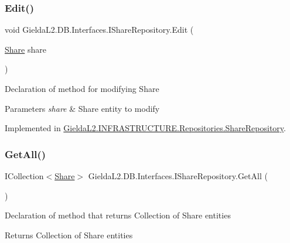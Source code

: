 \subsubsection{\texorpdfstring{Edit()}{Edit()}}
{\footnotesize\ttfamily void Gielda\+L2.\+D\+B.\+Interfaces.\+I\+Share\+Repository.\+Edit (\begin{DoxyParamCaption}\item[{\mbox{\hyperlink{class_gielda_l2_1_1_d_b_1_1_entities_1_1_share}{Share}}}]{share }\end{DoxyParamCaption})}



Declaration of method for modifying Share 


\begin{DoxyParams}{Parameters}
{\em share} & Share entity to modify\\
\hline
\end{DoxyParams}


Implemented in \mbox{\hyperlink{class_gielda_l2_1_1_i_n_f_r_a_s_t_r_u_c_t_u_r_e_1_1_repositories_1_1_share_repository_ac3b39b1ed8794698ad74054688667e6a}{Gielda\+L2.\+I\+N\+F\+R\+A\+S\+T\+R\+U\+C\+T\+U\+R\+E.\+Repositories.\+Share\+Repository}}.

\mbox{\label{interface_gielda_l2_1_1_d_b_1_1_interfaces_1_1_i_share_repository_a5e13f8b06cb4711bb54137dabf783ed1}} 
\subsubsection{\texorpdfstring{GetAll()}{GetAll()}}
{\footnotesize\ttfamily I\+Collection$<$\mbox{\hyperlink{class_gielda_l2_1_1_d_b_1_1_entities_1_1_share}{Share}}$>$ Gielda\+L2.\+D\+B.\+Interfaces.\+I\+Share\+Repository.\+Get\+All (\begin{DoxyParamCaption}{ }\end{DoxyParamCaption})}



Declaration of method that returns Collection of Share entities 

\begin{DoxyReturn}{Returns}
Collection of Share entities
\end{DoxyReturn}


